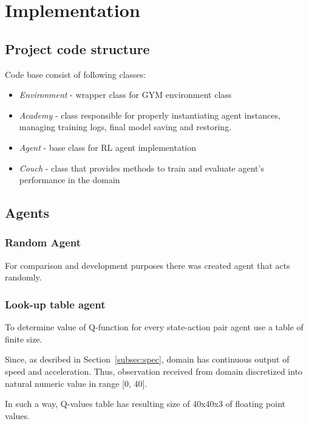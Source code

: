 \documentclass[12pt]{article}
\begin{document}
\newpage
\section{Implementation}
\subsection{Project code structure}{
Code base consist of following classes:
\begin{itemize}
\item \textit{Environment} - wrapper class for GYM environment class
\item \textit{Academy} - class responsible for properly instantiating agent instances, managing training logs, final model saving and restoring.
\item \textit{Agent} - base class for RL agent implementation
\item \textit{Couch} - class that provides methods to train and evaluate agent's performance in the domain
\end{itemize}
}
\subsection{Agents}
\subsubsection{Random Agent}{For comparison and development purposes there was created agent that acts randomly.}
\subsubsection{Look-up table agent}{
To determine value of Q-function for every state-action pair agent use a table of finite size.\par
Since, as desribed in Section~\ref{subsec:spec}, domain has continuous output of speed and acceleration. Thus, observation received from domain discretized into natural numeric value in range [0, 40].\par
In such a way, Q-values table has resulting size of 40x40x3 of floating point values.
}
\end{document}

